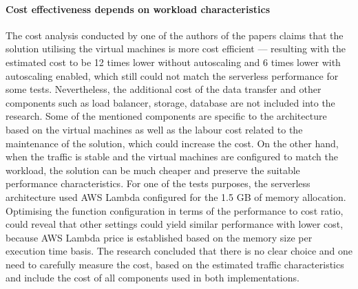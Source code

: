 \paragraph*{Cost effectiveness depends on workload characteristics}

The cost analysis conducted by one of the authors of the papers \cite{ServerlessComputingAnInvestigationOfDeploymentEnvironmentsForWebAPIs} claims that the solution utilising the virtual machines is more cost efficient --- resulting with the estimated cost to be 12 times lower without autoscaling and 6 times lower with autoscaling enabled, which still could not match the serverless performance for some tests.
Nevertheless, the additional cost of the data transfer and other components such as load balancer, storage, database are not included into the research.
Some of the mentioned components are specific to the architecture based on the virtual machines as well as the labour cost related to the maintenance of the solution, which could increase the cost.
On the other hand, when the traffic is stable and the virtual machines are configured to match the workload, the solution can be much cheaper and preserve the suitable performance characteristics.
For one of the tests purposes, the serverless architecture used AWS Lambda configured for the 1.5 GB of memory allocation. Optimising the function configuration in terms of the performance to cost ratio, could reveal that other settings could yield similar performance with lower cost, because AWS Lambda price is established based on the memory size per execution time basis.
The research concluded that there is no clear choice and one need to carefully measure the cost, based on the estimated traffic characteristics and include the cost of all components used in both implementations.







